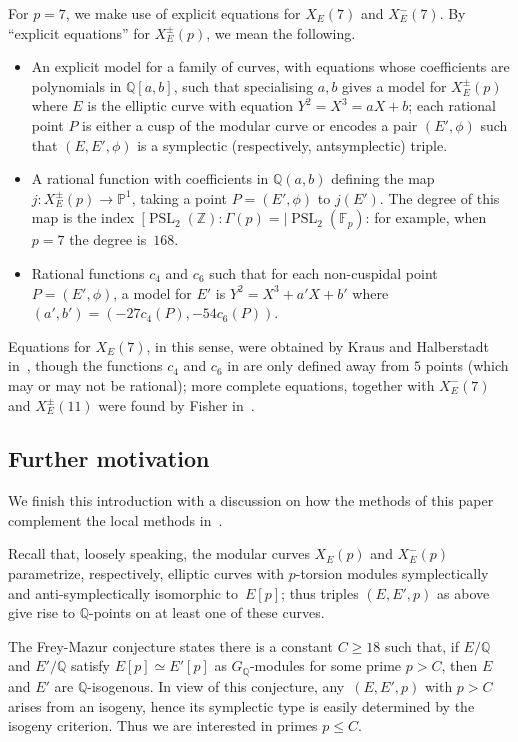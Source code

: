 \documentclass[12pt]{amsart}
\newcommand{\F}{\mathbb{F}}
\newcommand{\PP}{\mathbb{P}}
\newcommand{\Q}{\mathbb{Q}}
\newcommand{\Z}{\mathbb{Z}}
\newcommand{\PSL}{\operatorname{PSL}}
\numberwithin{equation}{section}
\theoremstyle{definition}
\theoremstyle{remark}
\begin{document}
For $p=7$, we make use of explicit equations for $X_E(7)$ and
$X_E^-(7)$.  By ``explicit equations'' for $X_E^{\pm}(p)$, we mean the
following.
\begin{itemize}
  \item An explicit model for a family of curves, with equations whose
    coefficients are polynomials in $\Q[a,b]$, such that specialising
    $a,b$ gives a model for $X_E^{\pm}(p)$ where $E$ is the elliptic
    curve with equation $Y^2=X^3=aX+b$; each rational point $P$ is
    either a cusp of the modular curve or encodes a pair $(E',\phi)$
    such that $(E,E',\phi)$ is a symplectic (respectively,
    antsymplectic) triple.
    \item A rational function with coefficients in $\Q(a,b)$ defining
      the map $j: X_E^{\pm}(p) \to \PP^1$, taking a point
      $P=(E',\phi)$ to $j(E')$.  The degree of this map is the
      index~$[\PSL_2(\Z):\Gamma(p) = |\PSL_2(\F_p)$: for example, when
        $p=7$ the degree is~$168$.
      \item Rational functions $c_4$ and $c_6$ such that for each
        non-cuspidal point~$P=(E',\phi)$, a model for $E'$ is
        $Y^2=X^3+a'X+b'$ where $(a',b')=(-27c_4(P),-54c_6(P))$.
\end{itemize}
Equations for $X_E(7)$, in this sense, were obtained by Kraus and
Halberstadt in~\cite{Halberstadt-Kraus-XE7}, though the functions
$c_4$ and $c_6$ in \cite{Halberstadt-Kraus-XE7} are only defined away
from $5$ points (which may or may not be rational); more complete
equations, together with $X_E^-(7)$ and $X_E^{\pm}(11)$ were found by
Fisher in~\cite{Fisher}.

\subsection{Further motivation} \label{S:motivation}
We finish this introduction with a discussion 
on how the methods of this paper complement the local methods in~\cite{FKSym}.

Recall that, loosely speaking, the modular curves $X_E(p)$ and
$X_E^-(p)$ parametrize, respectively, elliptic curves with
$p$-torsion modules symplectically and anti-symplectically isomorphic
to~$E[p]$; thus triples $(E,E',p)$ as above give rise to $\Q$-points
on at least one of these curves. 

The Frey-Mazur conjecture states there is a constant $C \geq 18$ such that, if $E/\Q$ and $E'/\Q$ satisfy $E[p] \simeq E'[p]$ as
$G_\Q$-modules for some prime $p > C$, then $E$ and $E'$ are
$\Q$-isogenous. In view of this conjecture, any~$(E,E',p)$ with $p > C$ arises from an isogeny, hence its symplectic type is easily determined by the isogeny criterion. Thus we are interested in primes $p \leq C$.
\end{document}
